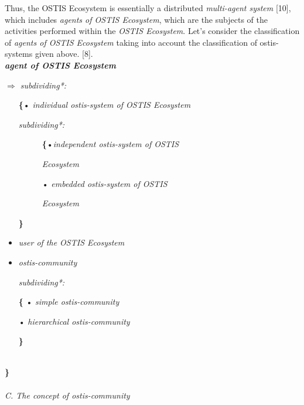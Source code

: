 \documentclass[a4paper,10pt]{article}
\begin{document}
\begin{multicols}{2}
Thus, the OSTIS Ecosystem is essentially a distributed
\textit{multi-agent system} [10], which includes \textit{agents of OSTIS
Ecosystem}, which are the subjects of the activities performed within the\textit{ OSTIS Ecosystem}. Let’s consider the
classification of \textit{agents of OSTIS Ecosystem} taking into
account the classification of ostis-systems given above.
[8].\\


\hspace{-0.6cm}\textbf{\textit{agent of OSTIS Ecosystem}}


\hspace{-0.6cm}\textit{$\Rightarrow$ subdividing*:}
\begin{itemize}
\setlength{\parskip}{0pt}
    \item [\textbf{\{}•] \textit{individual ostis-system of OSTIS 
    Ecosystem}


\textit{\Rightarrow subdividing*: }


\begin{description}
        \item[]\hspace{0.2cm}\textbf{\{}•\hspace{0.2cm}\textit{independent ostis-system of OSTIS}
        \item[]\hspace{0.7cm}\textit{Ecosystem}
        \item[]\hspace{0.4cm}•\textit{ embedded ostis-system of OSTIS}
        \item[]\hspace{0.7cm}\textit{Ecosystem}
    \end{description}






\hspace{0.5cm}\textbf{\}}
\setlength{\parskip}{0pt}
 \item \textit{user of the OSTIS Ecosystem}
 \item \textit{ostis-community }
 
\textit{\Rightarrow subdividing*:}


\hspace{0.4cm}\textbf{\{} • \textit{ simple ostis-community}



\hspace{0.6cm} • \textit{hierarchical ostis-community}


\hspace{0.4cm}\textbf{\}}
\end{itemize} \\
\hspace{0.4cm}\textbf{\}}
\\ \\
\hspace{-0.4cm}\textit{\vspace{0.2cm}C. The concept of ostis-community}



\end{multicols}
\end{document}
